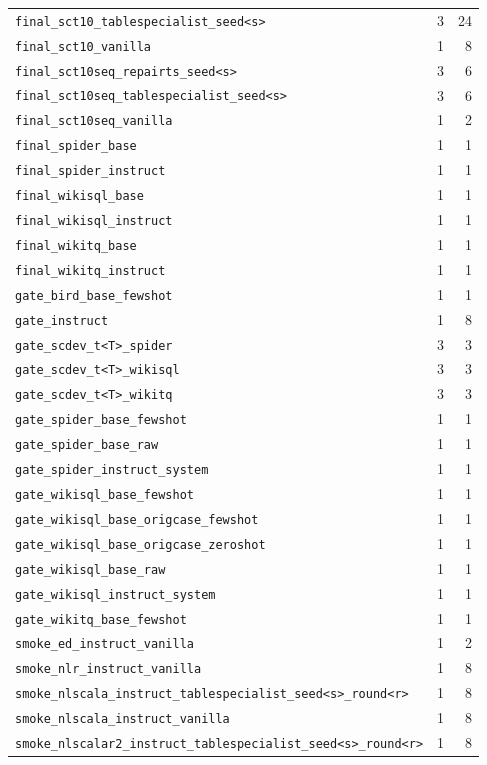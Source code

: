 {\begin{longtable}{@{}p{11.2cm}rr@{}}
\texttt{final\_sct10\_tablespecialist\_seed<s>} & 3 & 24\\
\texttt{final\_sct10\_vanilla} & 1 & 8\\
\texttt{final\_sct10seq\_repairts\_seed<s>} & 3 & 6\\
\texttt{final\_sct10seq\_tablespecialist\_seed<s>} & 3 & 6\\
\texttt{final\_sct10seq\_vanilla} & 1 & 2\\
\texttt{final\_spider\_base} & 1 & 1\\
\texttt{final\_spider\_instruct} & 1 & 1\\
\texttt{final\_wikisql\_base} & 1 & 1\\
\texttt{final\_wikisql\_instruct} & 1 & 1\\
\texttt{final\_wikitq\_base} & 1 & 1\\
\texttt{final\_wikitq\_instruct} & 1 & 1\\
\texttt{gate\_bird\_base\_fewshot} & 1 & 1\\
\texttt{gate\_instruct} & 1 & 8\\
\texttt{gate\_scdev\_t<T>\_spider} & 3 & 3\\
\texttt{gate\_scdev\_t<T>\_wikisql} & 3 & 3\\
\texttt{gate\_scdev\_t<T>\_wikitq} & 3 & 3\\
\texttt{gate\_spider\_base\_fewshot} & 1 & 1\\
\texttt{gate\_spider\_base\_raw} & 1 & 1\\
\texttt{gate\_spider\_instruct\_system} & 1 & 1\\
\texttt{gate\_wikisql\_base\_fewshot} & 1 & 1\\
\texttt{gate\_wikisql\_base\_origcase\_fewshot} & 1 & 1\\
\texttt{gate\_wikisql\_base\_origcase\_zeroshot} & 1 & 1\\
\texttt{gate\_wikisql\_base\_raw} & 1 & 1\\
\texttt{gate\_wikisql\_instruct\_system} & 1 & 1\\
\texttt{gate\_wikitq\_base\_fewshot} & 1 & 1\\
\texttt{smoke\_ed\_instruct\_vanilla} & 1 & 2\\
\texttt{smoke\_nlr\_instruct\_vanilla} & 1 & 8\\
\texttt{smoke\_nlscala\_instruct\_tablespecialist\_seed<s>\_round<r>} & 1 & 8\\
\texttt{smoke\_nlscala\_instruct\_vanilla} & 1 & 8\\
\texttt{smoke\_nlscalar2\_instruct\_tablespecialist\_seed<s>\_round<r>} & 1 & 8\\

\end{longtable}}
